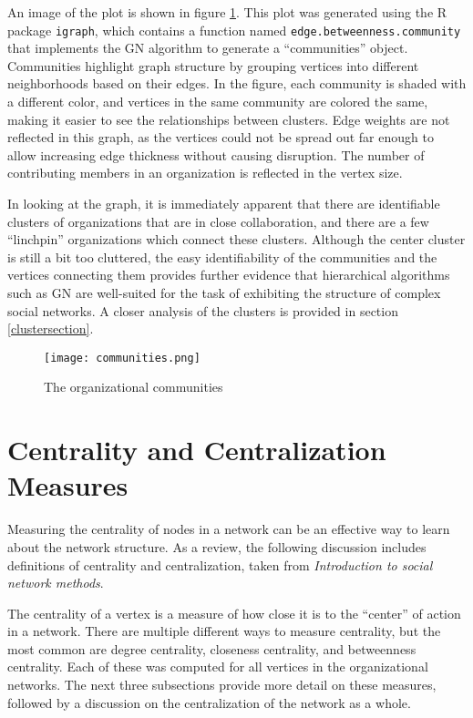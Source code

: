 An image of the plot is shown in figure \ref{fig:orgCommunities}. This plot was generated using the R package \verb|igraph|, which contains a function named \verb|edge.betweenness.community| that implements the GN algorithm to generate a ``communities'' object. Communities highlight graph structure by grouping vertices into different neighborhoods based on their edges. In the figure, each community is shaded with a different color, and vertices in the same community are colored the same, making it easier to see the relationships between clusters. Edge weights are not reflected in this graph, as the vertices could not be spread out far enough to allow increasing edge thickness without causing disruption. The number of contributing members in an organization is reflected in the vertex size.

In looking at the graph, it is immediately apparent that there are identifiable clusters of organizations that are in close collaboration, and there are a few ``linchpin'' organizations which connect these clusters. Although the center cluster is still a bit too cluttered, the easy identifiability of the communities and the vertices connecting them provides further evidence that hierarchical algorithms such as GN are well-suited for the task of exhibiting the structure of complex social networks. A closer analysis of the clusters is provided in section \ref{clustersection}.
\begin{figure}
	\texttt{[image: communities.png]}
	\centering
	\caption{The organizational communities}
	\label{fig:orgCommunities}
\end{figure}

\section{Centrality and Centralization Measures}


Measuring the centrality of nodes in a network can be an effective way to learn about the network structure. As a review, the following discussion includes definitions of centrality and centralization, taken from \textit{Introduction to social network methods}\cite{hanneman}.

The centrality of a vertex is a measure of how close it is to the ``center'' of action in a network. There are multiple different ways to measure centrality, but the most common are degree centrality, closeness centrality, and betweenness centrality. Each of these was computed for all vertices in the organizational networks. The next three subsections provide more detail on these measures, followed by a discussion on the centralization of the network as a whole.

